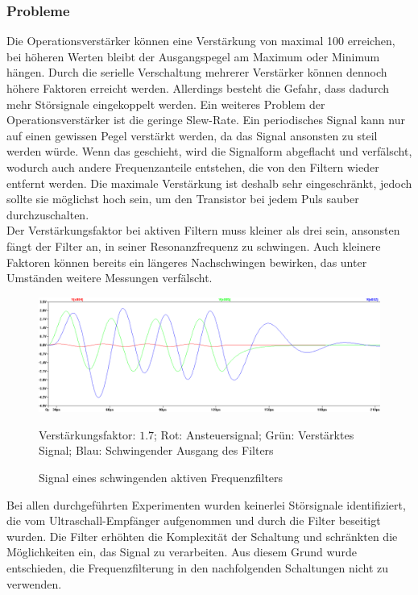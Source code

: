 \subsubsection{Probleme}
Die Operationsverstärker können eine Verstärkung von maximal 100 erreichen, bei höheren Werten bleibt der Ausgangspegel am Maximum oder Minimum hängen. Durch die serielle Verschaltung mehrerer Verstärker können dennoch höhere Faktoren erreicht werden. Allerdings besteht die Gefahr, dass dadurch mehr Störsignale eingekoppelt werden. Ein weiteres Problem der Operationsverstärker ist die geringe Slew-Rate. Ein periodisches Signal kann nur auf einen gewissen Pegel verstärkt werden, da das Signal ansonsten zu steil werden würde. Wenn das geschieht, wird die Signalform abgeflacht und verfälscht, wodurch auch andere Frequenzanteile entstehen, die von den Filtern wieder entfernt werden. Die maximale Verstärkung ist deshalb sehr eingeschränkt, jedoch sollte sie möglichst hoch sein, um den Transistor bei jedem Puls sauber durchzuschalten.\\
Der Verstärkungsfaktor bei aktiven Filtern muss kleiner als drei sein, ansonsten fängt der Filter an, in seiner Resonanzfrequenz zu schwingen. Auch kleinere Faktoren können bereits ein längeres Nachschwingen bewirken, das unter Umständen weitere Messungen verfälscht.
\begin{figure}[H]
\centering
\includegraphics[width=(\textwidth), angle=0]{sim/schwingen_bei_verstaerkung.png}
\caption{Signal eines schwingenden aktiven Frequenzfilters} \label{img:Sim2}
Verstärkungsfaktor: $1.7$; Rot: Ansteuersignal; Grün: Verstärktes Signal; Blau: Schwingender Ausgang des Filters
\end{figure}
Bei allen durchgeführten Experimenten wurden keinerlei Störsignale identifiziert, die vom Ultraschall-Empfänger aufgenommen und durch die Filter beseitigt wurden. Die Filter erhöhten die Komplexität der Schaltung und schränkten die Möglichkeiten ein, das Signal zu verarbeiten. Aus diesem Grund wurde entschieden, die Frequenzfilterung in den nachfolgenden Schaltungen nicht zu verwenden.

